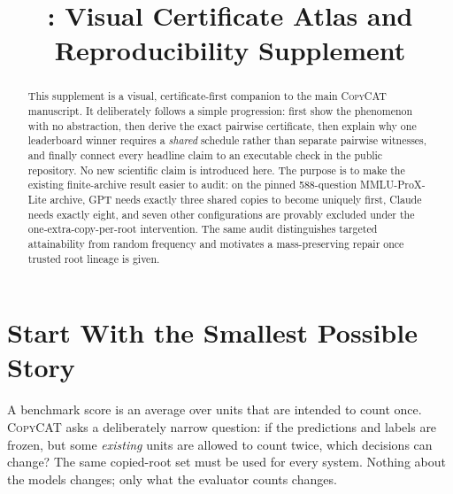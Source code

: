 \documentclass[conference]{IEEEtran}
\title{\copycat: Visual Certificate Atlas and Reproducibility Supplement}
\author{\IEEEauthorblockN{Sushanth Dasari}
\IEEEauthorblockA{Amity International School, Sector-46, Gurugram, India\\
Supplementary material for the CopyCAT research manuscript}}
\newcommand{\copycat}{\textsc{CopyCAT}}
\begin{document}
\maketitle

\begin{abstract}
This supplement is a visual, certificate-first companion to the main \copycat{} manuscript. It deliberately follows a simple progression: first show the phenomenon with no abstraction, then derive the exact pairwise certificate, then explain why one leaderboard winner requires a \emph{shared} schedule rather than separate pairwise witnesses, and finally connect every headline claim to an executable check in the public repository. No new scientific claim is introduced here. The purpose is to make the existing finite-archive result easier to audit: on the pinned 588-question MMLU-ProX-Lite archive, GPT needs exactly three shared copies to become uniquely first, Claude needs exactly eight, and seven other configurations are provably excluded under the one-extra-copy-per-root intervention. The same audit distinguishes targeted attainability from random frequency and motivates a mass-preserving repair once trusted root lineage is given.
\end{abstract}

\section{Start With the Smallest Possible Story}
A benchmark score is an average over units that are intended to count once. \copycat{} asks a deliberately narrow question: if the predictions and labels are frozen, but some \emph{existing} units are allowed to count twice, which decisions can change? The same copied-root set must be used for every system. Nothing about the models changes; only what the evaluator counts changes.
\end{document}
